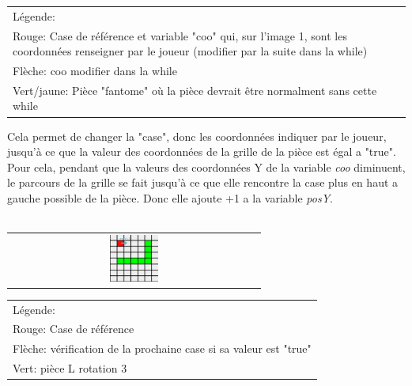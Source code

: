             \begin{tabular}{|m{13.5cm}|}
                \hline
                {\small Légende:}\\
                {\small Rouge: Case de référence et variable "coo" qui, sur l'image 1, sont les coordonnées renseigner par le joueur (modifier par la suite dans la while)}\\
                {\small Flèche: coo modifier dans la while}\\
                {\small Vert/jaune: Pièce "fantome" où la pièce devrait être normalment sans cette while}\\
                \hline
            \end{tabular}

            Cela permet de changer la "case", donc les coordonnées indiquer par le joueur, jusqu'à ce que la valeur des coordonnées de la grille de la pièce est égal a "true".\\
            Pour cela, pendant que la valeurs des coordonnées Y de la variable \textit{coo} diminuent, le parcours de la grille se fait jusqu'à ce que elle rencontre la case plus en haut a gauche possible de la pièce. Donc elle ajoute +1 a la variable \textit{posY}.\\
                \\

                \begin{table}[h]\label{img:prblmPlacementPiece}
                    \begin{tabular}{c}
                        \includegraphics[width=0.20\textwidth, keepaspectratio]{img/pieceLposY.png}
                    \end{tabular}
                    \begin{tabular}{l}
                        {\small Légende:}\\
                        {\small Rouge: Case de référence}\\
                        {\small Flèche: vérification de la prochaine case si sa valeur est "true"}\\
                        {\small Vert: pièce L rotation 3}\\
                    \end{tabular}
               \end{table}


